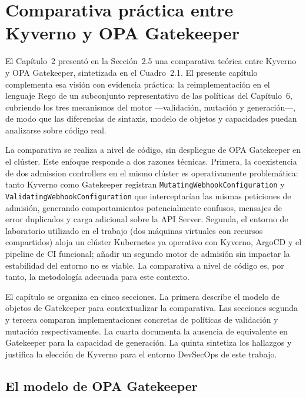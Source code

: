 \chapter{Comparativa práctica entre Kyverno y OPA Gatekeeper}

El Capítulo~2 presentó en la Sección~2.5 una comparativa teórica entre Kyverno y OPA Gatekeeper, sintetizada en el Cuadro~2.1. El presente capítulo complementa esa visión con evidencia práctica: la reimplementación en el lenguaje Rego \cite{rego_docs} de un subconjunto representativo de las políticas del Capítulo~6, cubriendo los tres mecanismos del motor ---validación, mutación y generación---, de modo que las diferencias de sintaxis, modelo de objetos y capacidades puedan analizarse sobre código real.

La comparativa se realiza a nivel de código, sin despliegue de OPA Gatekeeper en el clúster. Este enfoque responde a dos razones técnicas. Primera, la coexistencia de dos admission controllers en el mismo clúster es operativamente problemática: tanto Kyverno como Gatekeeper registran \texttt{MutatingWebhookConfiguration} y \texttt{ValidatingWebhookConfiguration} que interceptarían las mismas peticiones de admisión, generando comportamientos potencialmente confusos, mensajes de error duplicados y carga adicional sobre la API Server. Segunda, el entorno de laboratorio utilizado en el trabajo (dos máquinas virtuales con recursos compartidos) aloja un clúster Kubernetes ya operativo con Kyverno, ArgoCD y el pipeline de CI funcional; añadir un segundo motor de admisión sin impactar la estabilidad del entorno no es viable. La comparativa a nivel de código es, por tanto, la metodología adecuada para este contexto.

El capítulo se organiza en cinco secciones. La primera describe el modelo de objetos de Gatekeeper para contextualizar la comparativa. Las secciones segunda y tercera comparan implementaciones concretas de políticas de validación y mutación respectivamente. La cuarta documenta la ausencia de equivalente en Gatekeeper para la capacidad de generación. La quinta sintetiza los hallazgos y justifica la elección de Kyverno para el entorno DevSecOps de este trabajo.

\section{El modelo de OPA Gatekeeper}

